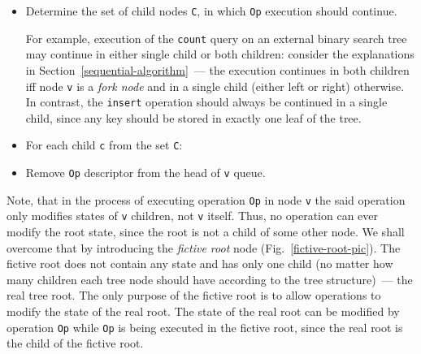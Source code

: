 \documentclass[times, dvipsnames,%
               languages={russian,english} %
              ]{itmo-student-thesis}
\begin{document}
\begin{itemize}
    \item Determine the set of child nodes \texttt{C}, in which \texttt{Op} execution should continue. 
    
    For example, execution of the \texttt{count} query on an external binary search tree may continue in either single child or both children: consider the explanations in Section~\ref{sequential-algorithm}~--- the execution continues in both children iff node \texttt{v} is a \emph{fork node} and in a single child (either left or right) otherwise. In contrast, the \texttt{insert} operation should always be continued in a single child, since any key should be stored in exactly one leaf of the tree.
    
    \item For each child \texttt{c} from the set \texttt{C}:
    
    
    \item Remove \texttt{Op} descriptor from the head of \texttt{v} queue.
\end{itemize}

\bigbreak

Note, that in the process of executing operation \texttt{Op} in node \texttt{v} the said operation only modifies states of \texttt{v} children, not \texttt{v} itself. Thus, no operation can ever modify the root state, since the root is not a child of some other node. We shall overcome that by introducing the \emph{fictive root} node (Fig.~\ref{fictive-root-pic}). The fictive root does not contain any state and has only one child (no matter how many children each tree node should have according to the tree structure)~--- the real tree root. The only purpose of the fictive root is to allow operations to modify the state of the real root. The state of the real root can be modified by operation \texttt{Op} while \texttt{Op} is being executed in the fictive root, since the real root is the child of the fictive root.
\end{document}
